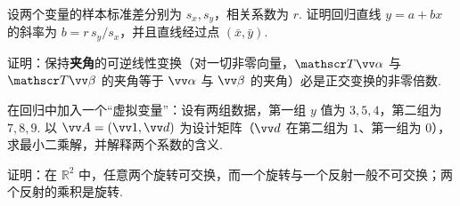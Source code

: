 {\begin{exB}
			\item\label{ex:ip:B12} 设两个变量的样本标准差分别为 $s_x,s_y$，相关系数为 $r$. 证明回归直线 $y=a+bx$ 的斜率为 $b=r\,s_y/s_x$，并且直线经过点 $(\bar x,\bar y)$.
			\item\label{ex:ip:B13} 证明：保持\textbf{夹角}的可逆线性变换（对一切非零向量，$\mathscr T\vv\alpha$ 与 $\mathscr T\vv\beta$ 的夹角等于 $\vv\alpha$ 与 $\vv\beta$ 的夹角）必是正交变换的非零倍数.
			\item\label{ex:ip:B14} 在回归中加入一个“虚拟变量”：设有两组数据，第一组 $y$ 值为 $3,5,4$，第二组为 $7,8,9$. 以 $\vv A=(\vv 1,\vv d)$ 为设计矩阵（$\vv d$ 在第二组为 $1$、第一组为 $0$），求最小二乘解，并解释两个系数的含义.
			\item\label{ex:ip:B15} 证明：在 $\mathbb{R}^2$ 中，任意两个旋转可交换，而一个旋转与一个反射一般不可交换；两个反射的乘积是旋转.
		\end{exB}
		
}
